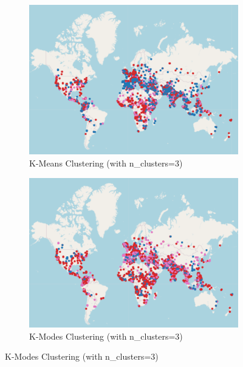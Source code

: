 \documentclass{article}
\begin{document}
\begin{figure}[htbp]
    \centering
    \begin{subfigure}{0.45\linewidth}
        \centering
        \includegraphics[width=\linewidth]{img//Clustering/Clusters K Means_resized.png}
        \caption{K-Means Clustering (with n\_clusters=3)}
        \label{fig:kmeans}
    \end{subfigure}
    \hfill
    \begin{subfigure}{0.45\linewidth}
        \centering
        \includegraphics[width=\linewidth]{img//Clustering/Clusters K Mode_resized.png}
        \caption{K-Modes Clustering (with n\_clusters=3)}
        \label{fig:kmodes}
    \end{subfigure}
    

\end{figure}
\end{document}

